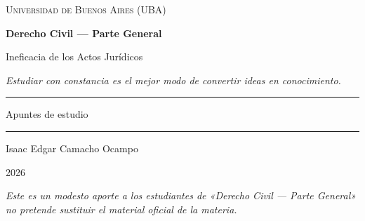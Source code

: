 \documentclass[12pt,oneside]{book}
\newcommand{\universidad}{Universidad de Buenos Aires (UBA)}
\newcommand{\materia}{Derecho Civil --- Parte General}
\newcommand{\titulo}{Ineficacia de los Actos Jurídicos}
\newcommand{\autor}{Isaac Edgar Camacho Ocampo}
\newcommand{\anio}{2026}
\begin{document}

\begin{titlepage}

\thispagestyle{empty}

\begin{center}

\vspace*{1cm}

{\large \textsc{\universidad}}

\vspace{3cm}

{\Huge \textbf{\materia}}

\vspace{1cm}

{\LARGE \titulo}

\vspace{0.8cm}

\textit{Estudiar con constancia es el mejor modo de convertir ideas en conocimiento.}

\vspace{1.2cm}

\rule{0.70\textwidth}{0.5pt}

\vspace{0.5cm}

{\large Apuntes de estudio}

\vspace{0.5cm}

\rule{0.70\textwidth}{0.5pt}

\vfill

{\large \autor}

\vspace{0.3cm}

{\large \anio}

\end{center}

\vfill

\begin{flushleft}
\textit{Este es un modesto aporte a los estudiantes de «\materia» no pretende sustituir el material oficial de la materia.}
\end{flushleft}

\end{titlepage}

\frontmatter
\tableofcontents
\mainmatter
\end{document}
